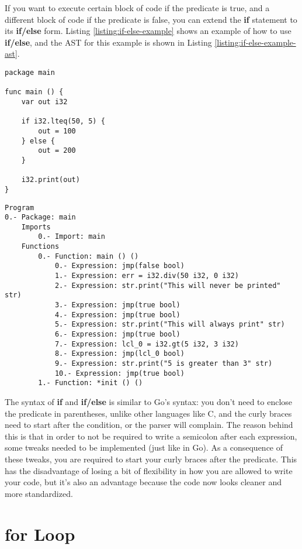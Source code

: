 \documentclass[11pt,fleqn,openany]{book} %
\begin{document}
If you want to execute certain block of code if the predicate is true, and a different block of code if the predicate is false, you can extend the \textbf{if} statement to its \textbf{if/else} form. Listing \ref{listing:if-else-example} shows an example of how to use \textbf{if/else}, and the AST for this example is shown in Listing \ref{listing:if-else-example-ast}.

\begin{lstlisting}[caption={Using If/Else for Control Flow},captionpos=b,label={listing:if-else-example}]
package main

func main () {
	var out i32

	if i32.lteq(50, 5) {
		out = 100
	} else {
		out = 200
	}

	i32.print(out)
}
\end{lstlisting}

\begin{lstlisting}[caption={Listing \ref{listing:if-else-example}'s Abstract Syntax Tree},captionpos=b,label={listing:if-else-example-ast}]
Program
0.- Package: main
	Imports
		0.- Import: main
	Functions
		0.- Function: main () ()
			0.- Expression: jmp(false bool)
			1.- Expression: err = i32.div(50 i32, 0 i32)
			2.- Expression: str.print("This will never be printed" str)
			3.- Expression: jmp(true bool)
			4.- Expression: jmp(true bool)
			5.- Expression: str.print("This will always print" str)
			6.- Expression: jmp(true bool)
			7.- Expression: lcl_0 = i32.gt(5 i32, 3 i32)
			8.- Expression: jmp(lcl_0 bool)
			9.- Expression: str.print("5 is greater than 3" str)
			10.- Expression: jmp(true bool)
		1.- Function: *init () ()
\end{lstlisting}

The syntax of \textbf{if} and \textbf{if/else} is similar to Go's syntax: you don't need to enclose the predicate in parentheses, unlike other languages like C, and the curly braces need to start after the condition, or the parser will complain. The reason behind this is that in order to not be required to write a semicolon after each expression, some tweaks needed to be implemented (just like in Go). As a consequence of these tweaks, you are required to start your curly braces after the predicate. This has the disadvantage of losing a bit of flexibility in how you are allowed to write your code, but it's also an advantage because the code now looks cleaner and more standardized.

\section{for Loop}
\end{document}
